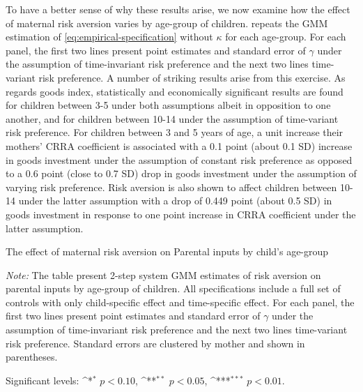 \documentclass[]{article}
\begin{document}
To have a better sense of why these results arise, we now examine how the effect of maternal risk aversion varies by age-group of children.  repeats the GMM estimation of \eqref{eq:empirical-specification} without $\kappa$ for each age-group. For each panel, the first two lines present point estimates and standard error of $\gamma$ under the assumption of time-invariant risk preference and the next two lines time-variant risk preference. A number of striking results arise from this exercise. As regards goods index, statistically and economically significant results are found for children between 3-5 under both assumptions albeit in opposition to one another, and for children between 10-14 under the assumption of time-variant risk preference. For children between 3 and 5 years of age, a unit increase their mothers' CRRA coefficient is associated with a 0.1 point (about 0.1 SD) increase in goods investment under the assumption of constant risk preference as opposed to a 0.6 point (close to 0.7 SD) drop in goods investment under the assumption of varying risk preference. Risk aversion is also shown to affect children between 10-14 under the latter assumption with a drop of 0.449 point (about 0.5 SD) in goods investment in response to one point increase in CRRA coefficient under the latter assumption. 

\begin{table}[!t]
	\centering
	\begin{threeparttable}
		\def\sym#1{\ifmmode^{#1}\else\(^{#1}\)\fi}
		\caption{The effect of maternal risk aversion on Parental inputs by child's age-group}	
		\setlength{\extrarowheight}{0.3em}
		
		\label{table:result-age}
		\begin{tablenotes}[flushleft] \footnotesize
			\item \textit{Note:} The table present 2-step system GMM estimates of risk aversion on parental inputs by age-group of children. All specifications include a full set of controls with only child-specific effect and time-specific effect. For each panel, the first two lines present point estimates and standard error of $\gamma$ under the assumption of time-invariant risk preference and the next two lines time-variant risk preference. Standard errors are clustered by mother and shown in parentheses. 
			\item Significant levels: \sym{*} \(p<0.10\), \sym{**} \(p<0.05\), \sym{***} \(p<0.01\).
		\end{tablenotes}
	\end{threeparttable}
\end{table}
\end{document}
